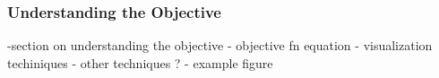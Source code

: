 \subsubsection*{Understanding the Objective}
-section on understanding the objective
    - objective fn equation
    - visualization techiniques
    - other techniques ?
    - example figure 

